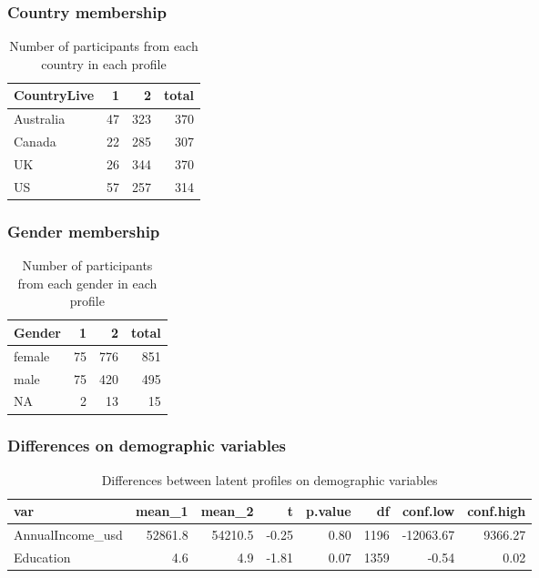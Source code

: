 \documentclass[]{article}
\begin{document}
\hypertarget{country-membership}{%
\subsubsection{Country membership}\label{country-membership}}

\begin{table}[H]

\caption{\label{tab:unnamed-chunk-7}Number of participants from each country in each profile}
\centering
\fontsize{6}{8}\selectfont
\begin{tabular}[t]{lrrr}
\toprule
CountryLive & 1 & 2 & total\\
\midrule
Australia & 47 & 323 & 370\\
Canada & 22 & 285 & 307\\
UK & 26 & 344 & 370\\
US & 57 & 257 & 314\\
\bottomrule
\end{tabular}
\end{table}

\hypertarget{gender-membership}{%
\subsubsection{Gender membership}\label{gender-membership}}

\begin{table}[H]

\caption{\label{tab:unnamed-chunk-8}Number of participants from each gender in each profile}
\centering
\fontsize{6}{8}\selectfont
\begin{tabular}[t]{lrrr}
\toprule
Gender & 1 & 2 & total\\
\midrule
female & 75 & 776 & 851\\
male & 75 & 420 & 495\\
NA & 2 & 13 & 15\\
\bottomrule
\end{tabular}
\end{table}

\hypertarget{differences-on-demographic-variables}{%
\subsubsection{Differences on demographic
variables}\label{differences-on-demographic-variables}}

\begin{table}[H]

\caption{\label{tab:unnamed-chunk-9}Differences between latent profiles on demographic variables}
\centering
\fontsize{6}{8}\selectfont
\begin{tabular}[t]{lrrrrrrr}
\toprule
var & mean\_1 & mean\_2 & t & p.value & df & conf.low & conf.high\\
\midrule
AnnualIncome\_usd & 52861.8 & 54210.5 & -0.25 & 0.80 & 1196 & -12063.67 & 9366.27\\
Education & 4.6 & 4.9 & -1.81 & 0.07 & 1359 & -0.54 & 0.02\\
\bottomrule
\end{tabular}
\end{table}
\end{document}
